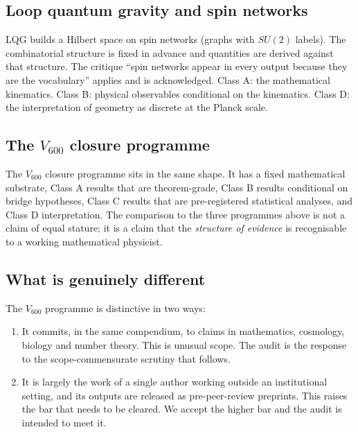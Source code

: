 \documentclass[11pt,a4paper]{article}
\begin{document}
\subsection{Loop quantum gravity and spin networks}

LQG \cite{rovelliLqg} builds a Hilbert space on spin networks
(graphs with $SU(2)$ labels). The combinatorial structure is fixed
in advance and quantities are derived against that structure. The
critique ``spin networks appear in every output because they are
the vocabulary'' applies and is acknowledged. Class A: the
mathematical kinematics. Class B: physical observables conditional
on the kinematics. Class D: the interpretation of geometry as
discrete at the Planck scale.

\subsection{The $V_{600}$ closure programme}

The $V_{600}$ closure programme sits in the same shape. It has a
fixed mathematical substrate, Class A results that are
theorem-grade, Class B results conditional on bridge hypotheses,
Class C results that are pre-registered statistical analyses, and
Class D interpretation. The comparison to the three programmes
above is not a claim of equal stature; it is a claim that the
\emph{structure of evidence} is recognisable to a working
mathematical physicist.

\subsection{What is genuinely different}

The $V_{600}$ programme is distinctive in two ways:

\begin{enumerate}[leftmargin=*]
  \item It commits, in the same compendium, to claims in
        mathematics, cosmology, biology and number theory. This is
        unusual scope. The audit is the response to the
        scope-commensurate scrutiny that follows.
  \item It is largely the work of a single author working outside
        an institutional setting, and its outputs are released as
        pre-peer-review preprints. This raises the bar that needs
        to be cleared. We accept the higher bar and the audit is
        intended to meet it.
\end{enumerate}
\end{document}
